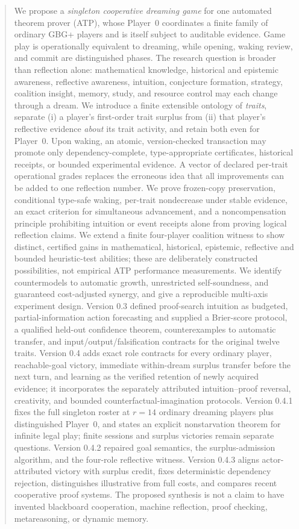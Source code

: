 \documentclass[11pt,letterpaper]{article}
\theoremstyle{definition}
\theoremstyle{plain}
\theoremstyle{definition}
\begin{document}
\begin{abstract}
We propose a \emph{singleton cooperative dreaming game} for one automated theorem prover (ATP), whose Player~0 coordinates a finite family of ordinary GBG+ players and is itself subject to auditable evidence. Game play is operationally equivalent to dreaming, while opening, waking review, and commit are distinguished phases. The research question is broader than reflection alone: mathematical knowledge, historical and epistemic awareness, reflective awareness, intuition, conjecture formation, strategy, coalition insight, memory, study, and resource control may each change through a dream. We introduce a finite extensible ontology of \emph{traits}, separate (i) a player's first-order trait surplus from (ii) that player's reflective evidence \emph{about} its trait activity, and retain both even for Player~0. Upon waking, an atomic, version-checked transaction may promote only dependency-complete, type-appropriate certificates, historical receipts, or bounded experimental evidence. A vector of declared per-trait operational grades replaces the erroneous idea that all improvements can be added to one reflection number. We prove frozen-copy preservation, conditional type-safe waking, per-trait nondecrease under stable evidence, an exact criterion for simultaneous advancement, and a noncompensation principle prohibiting intuition or event receipts alone from proving logical reflection claims. We extend a finite four-player coalition witness to show distinct, certified gains in mathematical, historical, epistemic, reflective and bounded heuristic-test abilities; these are deliberately constructed possibilities, not empirical ATP performance measurements. We identify countermodels to automatic growth, unrestricted self-soundness, and guaranteed cost-adjusted synergy, and give a reproducible multi-axis experiment design. Version 0.3 defined proof-search intuition as budgeted, partial-information action forecasting and supplied a Brier-score protocol, a qualified held-out confidence theorem, counterexamples to automatic transfer, and input/output/falsification contracts for the original twelve traits. Version 0.4 adds exact role contracts for every ordinary player, reachable-goal victory, immediate within-dream surplus transfer before the next turn, and learning as the verified retention of newly acquired evidence; it incorporates the separately attributed intuition--proof reversal, creativity, and bounded counterfactual-imagination protocols. Version 0.4.1 fixes the full singleton roster at $r=14$ ordinary dreaming players plus distinguished Player~0, and states an explicit nonstarvation theorem for infinite legal play; finite sessions and surplus victories remain separate questions. Version 0.4.2 repaired goal semantics, the surplus-admission algorithm, and the four-role reflective witness. Version 0.4.3 aligns actor-attributed victory with surplus credit, fixes deterministic dependency rejection, distinguishes illustrative from full costs, and compares recent cooperative proof systems. The proposed synthesis is not a claim to have invented blackboard cooperation, machine reflection, proof checking, metareasoning, or dynamic memory.
\end{abstract}
\begingroup\setlength{\parskip}{0pt}\tableofcontents\endgroup
\clearpage
\end{document}
